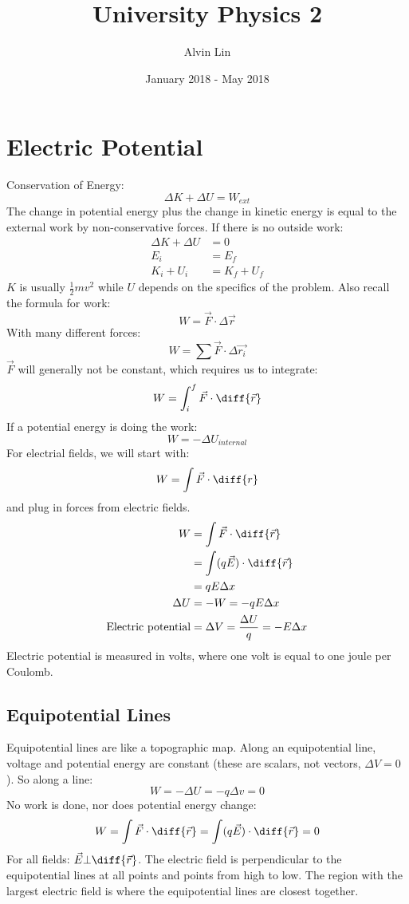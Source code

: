 \documentclass{math}
\title{University Physics 2}
\author{Alvin Lin}
\date{January 2018 - May 2018}
\begin{document}
\maketitle

\section*{Electric Potential}
Conservation of Energy:
\[ \Delta K+\Delta U = W_{ext} \]
The change in potential energy plus the change in kinetic energy is equal to
the external work by non-conservative forces. If there is no outside work:
\begin{align*}
  \Delta K+\Delta U &= 0 \\
  E_i &= E_f \\
  K_i+U_i &= K_f+U_f
\end{align*}
\( K \) is usually \( \frac{1}{2}mv^2 \) while \( U \) depends on the specifics
of the problem. Also recall the formula for work:
\[ W = \vec{F}\cdot\Delta\vec{r} \]
With many different forces:
\[ W = \sum\vec{F}\cdot\Delta\vec{r_i} \]
\( \vec{F} \) will generally not be constant, which requires us to integrate:
\[ W = \int_{i}^{f}\vec{F}\cdot\diff{\vec{r}} \]
If a potential energy is doing the work:
\[ W = -\Delta U_{internal} \]
For electrial fields, we will start with:
\[ W = \int\vec{F}\cdot\diff{r} \]
and plug in forces from electric fields.
\begin{align*}
  W &= \int\vec{F}\cdot\diff{\vec{r}} \\
  &= \int(q\vec{E})\cdot\diff{\vec{r}} \\
  &= qE\Delta x \\
  \Delta U &= -W = -qE\Delta x \\
  \text{Electric potential} &= \Delta V = \frac{\Delta U}{q} = -E\Delta x
\end{align*}
Electric potential is measured in volts, where one volt is equal to one joule
per Coulomb.

\subsection*{Equipotential Lines}
Equipotential lines are like a topographic map. Along an equipotential line,
voltage and potential energy are constant (these are scalars, not vectors,
\( \Delta V = 0 \)). So along a line:
\[ W = -\Delta U = -q\Delta v = 0 \]
No work is done, nor does potential energy change:
\[ W = \int\vec{F}\cdot\diff{\vec{r}} = \int(q\vec{E})\cdot\diff{\vec{r}} = 0 \]
For all fields: \( \vec{E}\bot\diff{\vec{r}} \). The electric field is
perpendicular to the equipotential lines at all points and points from high to
low. The region with the largest electric field is where the equipotential
lines are closest together.
\end{document}
